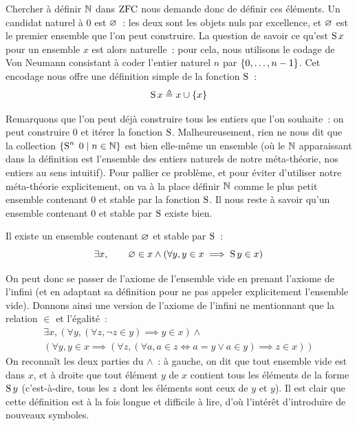 Chercher à définir $\mathbb N$ dans $\operatorname{ZFC}$ nous demande donc de définir ces
éléments. Un candidat naturel à $0$ est $\varnothing$~: les deux sont les objets
nuls par excellence, et $\varnothing$ est le premier ensemble que l'on peut
construire. La question de savoir ce qu'est $\operatorname{S} x$ pour un ensemble $x$ est
alors naturelle~: pour cela, nous utilisons le codage de Von Neumann consistant
à coder l'entier naturel $n$ par $\{0,\ldots,n - 1\}$. Cet encodage nous offre
une définition simple de la fonction $\operatorname{S}$~:
\[\operatorname{S} x\triangleq x\cup \{x\}\]

Remarquons que l'on peut déjà construire tous les entiers que l'on souhaite~:
on peut construire $0$ et itérer la fonction $\operatorname{S}$. Malheureusement, rien ne
nous dit que la collection $\left\{ \operatorname{S}^n\;0 \;\middle\vert\; n \in \mathbb N \right\}$ est bien elle-même
un ensemble (où le $\mathbb N$ apparaissant dans la définition est l'ensemble
des entiers naturels de notre méta-théorie, nos entiers au sens intuitif). Pour
pallier ce problème, et pour éviter d'utiliser notre méta-théorie explicitement,
on va à la place définir $\mathbb N$ comme le plus petit ensemble contenant $0$
et stable par la fonction $\operatorname{S}$. Il nous reste à savoir qu'un ensemble contenant
$0$ et stable par $\operatorname{S}$ existe bien.

\begin{axiom}[Infini]\label{ax.ZF.infini}
  Il existe un ensemble contenant $\varnothing$ et stable par $\operatorname{S}$~:
  \[\exists x, \qquad \varnothing \in x \land
  (\forall y, y \in x \implies \operatorname{S} y\in x)\]
\end{axiom}

\begin{remark}
  On peut donc se passer de l'axiome de l'ensemble vide en prenant l'axiome de
  l'infini (et en adaptant sa définition pour ne pas appeler explicitement
  l'ensemble vide). Donnons ainsi une version de l'axiome de l'infini ne
  mentionnant que la relation $\in$ et l'égalité~:
  \begin{multline*}
    \exists x,
    (\forall y, (\forall z, \lnot z \in y) \implies y \in x) \mathrel{\land}\\
    (\forall y, y \in x \implies
    (\forall z, (\forall a, a \in z \iff a = y \lor a \in y) \implies
    z \in x))
  \end{multline*}
  On reconnaît les deux parties du $\land$~: à gauche, on dit que tout ensemble
  vide est dans $x$, et à droite que tout élément $y$ de $x$ contient tous les
  éléments de la forme $\operatorname{S} y$ (c'est-à-dire, tous les $z$ dont les éléments
  sont ceux de $y$ et $y$). Il est clair que cette définition est à la fois
  longue et difficile à lire, d'où l'intérêt d'introduire de nouveaux symboles.
\end{remark}

